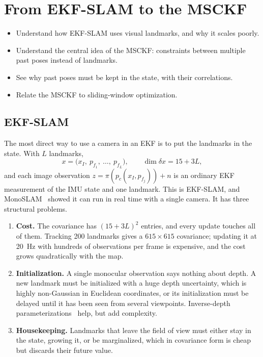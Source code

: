 \chapter{From EKF-SLAM to the MSCKF}
\label{ch:msckfintro}

\begin{objectives}
\begin{itemize}
  \item Understand how EKF-SLAM uses visual landmarks, and why it scales poorly.
  \item Understand the central idea of the MSCKF: constraints between multiple past poses instead of landmarks.
  \item See why past poses must be kept in the state, with their correlations.
  \item Relate the MSCKF to sliding-window optimization.
\end{itemize}
\end{objectives}

\section{EKF-SLAM}

The most direct way to use a camera in an EKF is to put the landmarks in the state. With $L$ landmarks,
\begin{equation}
  x = \big(x_I,\ p_{f_1},\ \dots,\ p_{f_L}\big), \qquad \dim\delta x = 15 + 3L,
\end{equation}
and each image observation $z = \pi(p_c(x_I, p_{f_j})) + n$ is an ordinary EKF measurement of the IMU state and one
landmark. This is EKF-SLAM, and MonoSLAM~\cite{davison2007monoslam} showed it can run in real time with a single camera.
It has three structural problems.
\begin{enumerate}
  \item \textbf{Cost.} The covariance has $(15 + 3L)^2$ entries, and every update touches all of them. Tracking 200 landmarks
        gives a $615\times615$ covariance; updating it at 20~Hz with hundreds of observations per frame is expensive, and the cost
        grows quadratically with the map.
  \item \textbf{Initialization.} A single monocular observation says nothing about depth. A new landmark must be
        initialized with a huge depth uncertainty, which is highly non-Gaussian in Euclidean coordinates, or its
        initialization must be delayed until it has been seen from several viewpoints. Inverse-depth
        parameterizations~\cite{civera2008inverse} help, but add complexity.
  \item \textbf{Housekeeping.} Landmarks that leave the field of view must either stay in the state, growing it, or be
        marginalized, which in covariance form is cheap but discards their future value.
\end{enumerate}

